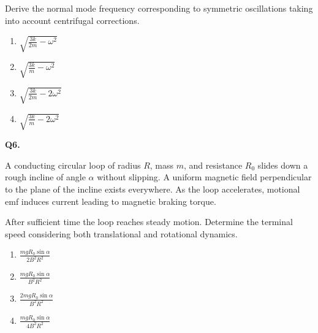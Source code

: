 \documentclass[12pt]{article}
\begin{document}
Derive the normal mode frequency corresponding to symmetric oscillations taking into account centrifugal corrections.
\begin{center}
\end{center}

\begin{enumerate}
\item[(A)] $\sqrt{\frac{3k}{2m}-\omega^2}$
\item[(B)] $\sqrt{\frac{3k}{m}-\omega^2}$
\item[(C)] $\sqrt{\frac{3k}{2m}-2\omega^2}$
\item[(D)] $\sqrt{\frac{3k}{m}-2\omega^2}$
\end{enumerate}


\textbf{Q6.}

A conducting circular loop of radius $R$, mass $m$, and resistance $R_0$ slides down a rough incline of angle $\alpha$ without slipping. A uniform magnetic field perpendicular to the plane of the incline exists everywhere. As the loop accelerates, motional emf induces current leading to magnetic braking torque.

After sufficient time the loop reaches steady motion. Determine the terminal speed considering both translational and rotational dynamics.

\begin{center}
\end{center}

\begin{enumerate}
\item[(A)] $\frac{mgR_0\sin\alpha}{2B^2R^2}$
\item[(B)] $\frac{mgR_0\sin\alpha}{B^2R^2}$
\item[(C)] $\frac{2mgR_0\sin\alpha}{B^2R^2}$
\item[(D)] $\frac{mgR_0\sin\alpha}{4B^2R^2}$
\end{enumerate}
\end{document}
